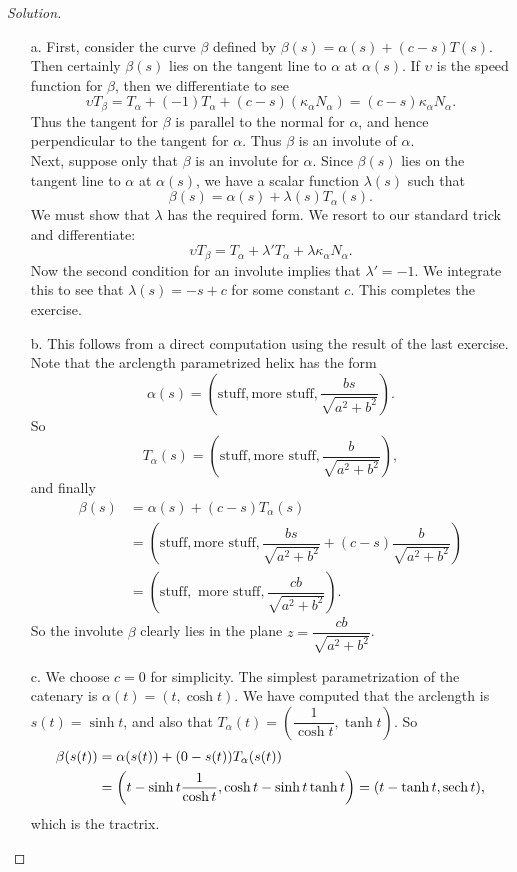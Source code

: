 \documentclass[Shifrin_Solutions_Spring_2015]{subfiles}
\begin{document}
\begin{proof}[Solution]
\begin{itemize}
\item[a.] First, consider the curve $\beta$ defined by $\beta(s) = \alpha(s) + (c-s)T(s)$. Then certainly $\beta(s)$ lies on the tangent line to $\alpha$ at $\alpha(s)$. If $\upsilon$ is the speed function for $\beta$, then we differentiate to see
\[
\upsilon T_{\beta} = T_{\alpha} + (-1)T_{\alpha}  + (c-s)(\kappa_{\alpha} N_{\alpha}) = (c-s) \kappa_{\alpha} N_{\alpha} .
\]
Thus the tangent for $\beta$ is parallel to the normal for $\alpha$, and hence perpendicular to the tangent for $\alpha$. Thus $\beta$ is an involute of $\alpha$. \\

Next, suppose only that $\beta$ is an involute for $\alpha$. Since $\beta(s)$ lies on the tangent line to $\alpha$ at $\alpha(s)$, we have a scalar function $\lambda(s)$ such that
\[
\beta(s) = \alpha(s) + \lambda(s) T_{\alpha}(s) .
\]
We must show that $\lambda$ has the required form. We resort to our standard trick and differentiate:
\[
\upsilon T_{\beta} = T_{\alpha} + \lambda' T_{\alpha} + \lambda\kappa_{\alpha} N_{\alpha}.
\]
Now the second condition for an involute implies that $\lambda' = -1$. We integrate this to see that $\lambda(s) = -s + c$ for some constant $c$. This completes the exercise.\\


\item[b.] This follows from a direct computation using the result of the last exercise. Note that the arclength parametrized helix has the form
\[
\alpha(s) = \left( \mbox{stuff}, \mbox{more stuff} , \dfrac{bs}{\sqrt{a^2+b^2}} \right) .
\]
So
\[
T_{\alpha}(s) = \left( \mbox{stuff}, \mbox{more stuff}, \dfrac{b}{\sqrt{a^2 + b^2}}  \right),
\]
and finally
\[
\begin{split}
\beta(s) & = \alpha(s) + (c - s) T_{\alpha}(s)\\
&  = \left( \mbox{stuff}, \mbox{more stuff}, \dfrac{bs}{\sqrt{a^2+b^2}} + (c-s)\dfrac{b}{\sqrt{a^2 + b^2}} \right) \\
	& = \left( \mbox{stuff}, \mbox{ more stuff} , \dfrac{cb}{\sqrt{a^2+b^2}} \right) .
\end{split}
\]
So the involute $\beta$ clearly lies in the plane $z = \dfrac{cb}{\sqrt{a^2+b^2}}$.\\

\item[c.]  We choose $c=0$ for simplicity. The simplest parametrization of the catenary is $\alpha(t) = ( t ,\cosh t)$. We have computed that the arclength is $s(t)  = \sinh t$, and also that
$T_{\alpha}(t) =\left( \dfrac{1}{\cosh t} , \tanh t\right)  $.
 So
\[
\begin{split}
\beta(s(t)) & = \alpha(s(t)) + (0 -s(t) ) T_{\alpha}(s(t))\\
&  = \left(t - \sinh t\dfrac{1}{\cosh t} , \cosh t - \sinh t \tanh t \right) = ( t - \tanh t , \operatorname{\mathrm{sech}} t) ,
\end{split}
\]
which is the tractrix.\\


\end{itemize}
\end{proof}
\end{document}
